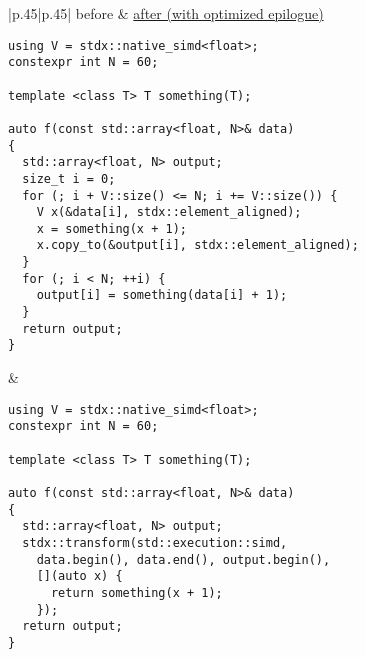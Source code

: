 \begin{table}[bt]
\begin{tabular}{|p{}|p{}|}
  before & \href{https://godbolt.org/z/5VBv6k}{after (with optimized epilogue)} \\
  \hline\smaller
  \begin{lstlisting}[linewidth=.45\textwidth]
using V = stdx::native_simd<float>;
constexpr int N = 60;

template <class T> T something(T);

auto f(const std::array<float, N>& data)
{
  std::array<float, N> output;
  size_t i = 0;
  for (; i + V::size() <= N; i += V::size()) {
    V x(&data[i], stdx::element_aligned);
    x = something(x + 1);
    x.copy_to(&output[i], stdx::element_aligned);
  }
  for (; i < N; ++i) {
    output[i] = something(data[i] + 1);
  }
  return output;
}
\end{lstlisting} & \smaller\begin{lstlisting}[linewidth=.45\textwidth]
using V = stdx::native_simd<float>;
constexpr int N = 60;

template <class T> T something(T);

auto f(const std::array<float, N>& data)
{
  std::array<float, N> output;
  stdx::transform(std::execution::simd,
    data.begin(), data.end(), output.begin(),
    [](auto x) {
      return something(x + 1);
    });
  return output;
}
  \end{lstlisting}
\end{tabular}
\caption{Tony Table}
\end{table}
